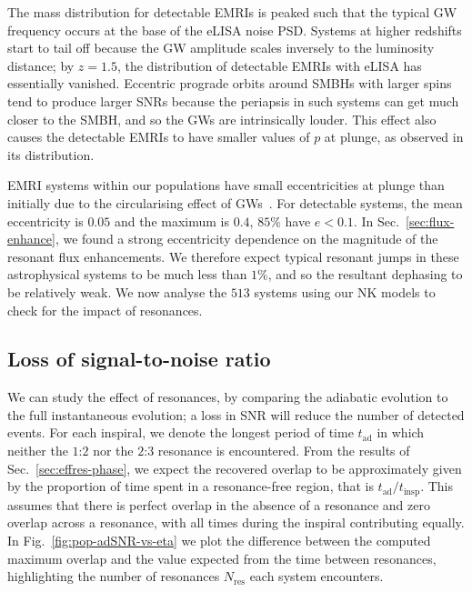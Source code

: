 \documentclass[aps,prd,amsfonts,amssymb,amsmath,nofootinbib,showpacs,superscriptaddress,twocolumn,floatfix]{revtex4-1}
\newcommand{\figref}[1]{Fig.~\ref{fig:#1}}
\newcommand{\secref}[1]{Sec.~\ref{sec:#1}}
\newcommand{\sub}[1]{\ensuremath{_\mathrm{#1}}}
\begin{document}
The mass distribution for detectable EMRIs is peaked such that the typical GW frequency occurs at the base of the eLISA noise PSD. Systems at higher redshifts start to tail off because the GW amplitude scales inversely to the luminosity distance; by $z = 1.5$, the distribution of detectable EMRIs with eLISA has essentially vanished. Eccentric prograde orbits around SMBHs with larger spins tend to produce larger SNRs because the periapsis in such systems can get much closer to the SMBH, and so the GWs are intrinsically louder. This effect also causes the detectable EMRIs to have smaller values of $p$ at plunge, as observed in its distribution.

EMRI systems within our populations have small eccentricities at plunge than initially due to the circularising effect of GWs~\cite{Peters1964}. For detectable systems, the mean eccentricity is $0.05$ and the maximum is $0.4$, $85\%$ have $e < 0.1$. In \secref{flux-enhance}, we found a strong eccentricity dependence on the magnitude of the resonant flux enhancements. We therefore expect typical resonant jumps in these astrophysical systems to be much less than $1\%$, and so the resultant dephasing to be relatively weak. We now analyse the $513$ systems using our NK models to check for the impact of resonances.

\subsection{Loss of signal-to-noise ratio}
\label{sec:population-SNR}

We can study the effect of resonances, by comparing the adiabatic evolution to the full instantaneous evolution; a loss in SNR will reduce the number of detected events. For each inspiral, we denote the longest period of time $t\sub{ad}$ in which neither the $1$:$2$ nor the $2$:$3$ resonance is encountered. From the results of \secref{effres-phase}, we expect the recovered overlap to be approximately given by the proportion of time spent in a resonance-free region, that is $t\sub{ad} / t\sub{insp}$. This assumes that there is perfect overlap in the absence of a resonance and zero overlap across a resonance, with all times during the inspiral contributing equally. 
In \figref{pop-adSNR-vs-eta} we plot the difference between the computed maximum overlap and the value expected from the time between resonances, highlighting the number of resonances $N\sub{res}$ each system encounters.
\end{document}
